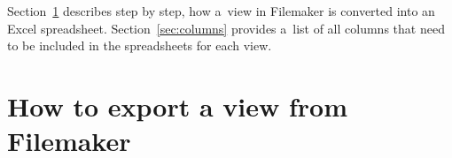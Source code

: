 \documentclass[12pt,a4paper]{scrartcl}
\begin{document}
\begin{center}
\end{center}

Section~\ref{sec:howto} describes step by step, how a~view in Filemaker is
converted into an Excel spreadsheet.
Section~\ref{sec:columns} provides a~list of all columns that need to be
included in the spreadsheets for each view.


\section{How to export a view from Filemaker}
\label{sec:howto}
\end{document}
